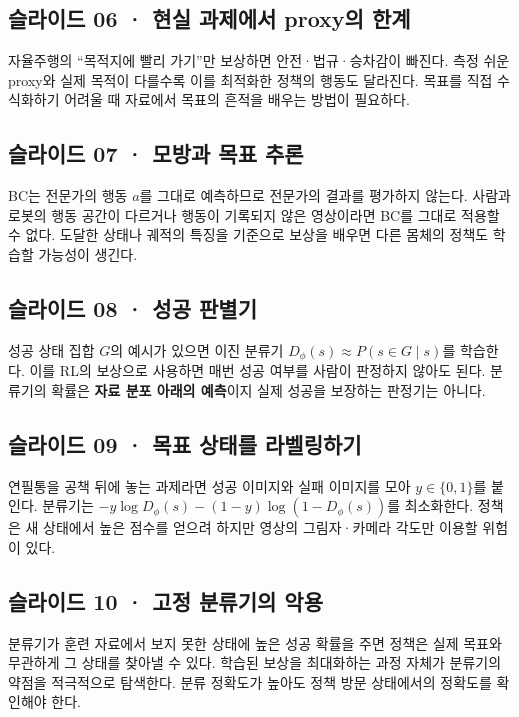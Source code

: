 \documentclass[11pt,a4paper]{article}
\begin{document}
\subsection{슬라이드 06 · 현실 과제에서 proxy의 한계}

자율주행의 “목적지에 빨리 가기”만 보상하면 안전·법규·승차감이 빠진다. 측정 쉬운 proxy와 실제 목적이 다를수록 이를 최적화한 정책의 행동도 달라진다. 목표를 직접 수식화하기 어려울 때 자료에서 목표의 흔적을 배우는 방법이 필요하다.\par

\subsection{슬라이드 07 · 모방과 목표 추론}

BC는 전문가의 행동 $a$를 그대로 예측하므로 전문가의 결과를 평가하지 않는다. 사람과 로봇의 행동 공간이 다르거나 행동이 기록되지 않은 영상이라면 BC를 그대로 적용할 수 없다. 도달한 상태나 궤적의 특징을 기준으로 보상을 배우면 다른 몸체의 정책도 학습할 가능성이 생긴다.\par

\subsection{슬라이드 08 · 성공 판별기}

성공 상태 집합 $G$의 예시가 있으면 이진 분류기 $D_\phi(s)\approx P(s\in G\mid s)$를 학습한다. 이를 RL의 보상으로 사용하면 매번 성공 여부를 사람이 판정하지 않아도 된다. 분류기의 확률은 \textbf{자료 분포 아래의 예측}이지 실제 성공을 보장하는 판정기는 아니다.\par

\subsection{슬라이드 09 · 목표 상태를 라벨링하기}

연필통을 공책 뒤에 놓는 과제라면 성공 이미지와 실패 이미지를 모아 $y\in\{0,1\}$를 붙인다. 분류기는 $-y\log D_\phi(s)-(1-y)\log(1-D_\phi(s))$를 최소화한다. 정책은 새 상태에서 높은 점수를 얻으려 하지만 영상의 그림자·카메라 각도만 이용할 위험이 있다.\par

\subsection{슬라이드 10 · 고정 분류기의 악용}

분류기가 훈련 자료에서 보지 못한 상태에 높은 성공 확률을 주면 정책은 실제 목표와 무관하게 그 상태를 찾아낼 수 있다. 학습된 보상을 최대화하는 과정 자체가 분류기의 약점을 적극적으로 탐색한다. 분류 정확도가 높아도 정책 방문 상태에서의 정확도를 확인해야 한다.\par
\end{document}
